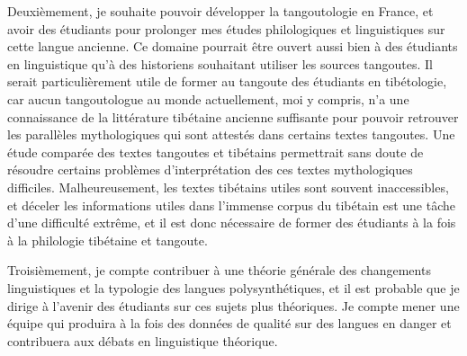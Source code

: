 \documentclass[oldfontcommands,oneside,a4paper,11pt]{memoir}
\begin{document}
Deuxièmement, je souhaite   pouvoir développer la tangoutologie en France, et avoir des étudiants pour prolonger mes études philologiques et linguistiques sur cette langue ancienne. Ce domaine pourrait être ouvert aussi bien à des étudiants en linguistique qu'à des historiens souhaitant utiliser les sources tangoutes. Il serait particulièrement utile de former au tangoute des étudiants en tibétologie, car aucun tangoutologue au monde actuellement, moi y compris, n'a une connaissance de la littérature tibétaine ancienne suffisante pour pouvoir retrouver les parallèles mythologiques qui sont attestés dans certains textes tangoutes. Une étude comparée des textes tangoutes et tibétains permettrait sans doute de résoudre certains problèmes d'interprétation des ces textes mythologiques difficiles. Malheureusement, les textes tibétains utiles sont souvent inaccessibles, et déceler les informations utiles dans l'immense corpus du tibétain est une tâche d'une difficulté extrême, et il est donc nécessaire de former des étudiants à la fois à la philologie tibétaine et tangoute.
 

Troisièmement, je compte  contribuer à une théorie générale des changements linguistiques et la typologie des langues polysynthétiques, et il est probable que je dirige à l'avenir des étudiants sur ces sujets plus théoriques. Je compte mener une équipe qui produira à la fois des données de qualité sur des langues en danger et contribuera aux débats   en linguistique théorique.






\pagebreak
	\tableofcontents
\end{document}
